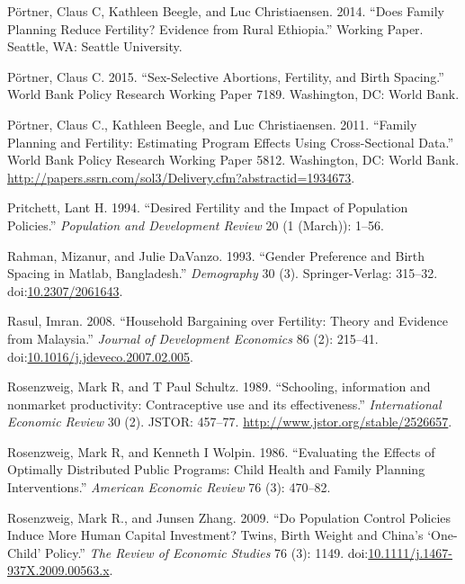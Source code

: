 \documentclass[]{article}
\begin{document}
\hypertarget{ref-Portner2014a}{}
Pörtner, Claus C, Kathleen Beegle, and Luc Christiaensen. 2014. ``Does Family Planning Reduce Fertility? Evidence from Rural Ethiopia.'' Working Paper. Seattle, WA: Seattle University.

\hypertarget{ref-Portner2015b}{}
Pörtner, Claus C. 2015. ``Sex-Selective Abortions, Fertility, and Birth Spacing.'' World Bank Policy Research Working Paper 7189. Washington, DC: World Bank.

\hypertarget{ref-Portner2011}{}
Pörtner, Claus C., Kathleen Beegle, and Luc Christiaensen. 2011. ``Family Planning and Fertility: Estimating Program Effects Using Cross-Sectional Data.'' World Bank Policy Research Working Paper 5812. Washington, DC: World Bank. \url{http://papers.ssrn.com/sol3/Delivery.cfm?abstractid=1934673}.

\hypertarget{ref-pritchett94a}{}
Pritchett, Lant H. 1994. ``Desired Fertility and the Impact of Population Policies.'' \emph{Population and Development Review} 20 (1 (March)): 1--56.

\hypertarget{ref-Rahman1993}{}
Rahman, Mizanur, and Julie DaVanzo. 1993. ``Gender Preference and Birth Spacing in Matlab, Bangladesh.'' \emph{Demography} 30 (3). Springer-Verlag: 315--32. doi:\href{https://doi.org/10.2307/2061643}{10.2307/2061643}.

\hypertarget{ref-Rasul2008}{}
Rasul, Imran. 2008. ``Household Bargaining over Fertility: Theory and Evidence from Malaysia.'' \emph{Journal of Development Economics} 86 (2): 215--41. doi:\href{https://doi.org/10.1016/j.jdeveco.2007.02.005}{10.1016/j.jdeveco.2007.02.005}.

\hypertarget{ref-Rosenzweig1989}{}
Rosenzweig, Mark R, and T Paul Schultz. 1989. ``Schooling, information and nonmarket productivity: Contraceptive use and its effectiveness.'' \emph{International Economic Review} 30 (2). JSTOR: 457--77. \url{http://www.jstor.org/stable/2526657}.

\hypertarget{ref-rosenzweig86}{}
Rosenzweig, Mark R, and Kenneth I Wolpin. 1986. ``Evaluating the Effects of Optimally Distributed Public Programs: Child Health and Family Planning Interventions.'' \emph{American Economic Review} 76 (3): 470--82.

\hypertarget{ref-Rosenzweig2009}{}
Rosenzweig, Mark R., and Junsen Zhang. 2009. ``Do Population Control Policies Induce More Human Capital Investment? Twins, Birth Weight and China's `One-Child' Policy.'' \emph{The Review of Economic Studies} 76 (3): 1149. doi:\href{https://doi.org/10.1111/j.1467-937X.2009.00563.x}{10.1111/j.1467-937X.2009.00563.x}.
\end{document}

